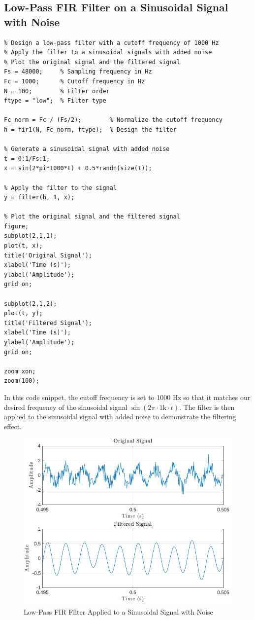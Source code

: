 \documentclass{zc-ust-hw}
\begin{document}
\subsection{Low-Pass FIR Filter on a Sinusoidal Signal with Noise}

\begin{verbatim}
% Design a low-pass filter with a cutoff frequency of 1000 Hz
% Apply the filter to a sinusoidal signals with added noise
% Plot the original signal and the filtered signal
Fs = 48000;     % Sampling frequency in Hz
Fc = 1000;      % Cutoff frequency in Hz
N = 100;        % Filter order
ftype = "low";  % Filter type

Fc_norm = Fc / (Fs/2);        % Normalize the cutoff frequency
h = fir1(N, Fc_norm, ftype);  % Design the filter

% Generate a sinusoidal signal with added noise
t = 0:1/Fs:1;
x = sin(2*pi*1000*t) + 0.5*randn(size(t));

% Apply the filter to the signal
y = filter(h, 1, x);

% Plot the original signal and the filtered signal
figure;
subplot(2,1,1);
plot(t, x);
title('Original Signal');
xlabel('Time (s)');
ylabel('Amplitude');
grid on;

subplot(2,1,2);
plot(t, y);
title('Filtered Signal');
xlabel('Time (s)');
ylabel('Amplitude');
grid on;

zoom xon;
zoom(100);
\end{verbatim}

In this code snippet, the cutoff frequency is set to 1000 Hz so that it
matches our desired frequency of the sinusoidal signal \( \sin (2\pi \cdot
1\text{k} \cdot t) \). The filter is then applied to the sinusoidal signal
with added noise to demonstrate the filtering effect.

\begin{figure}[hb]
  \begin{center}
    \includegraphics[width=\textwidth]{figures/low-pass-fir-filter-on-sin-wave.pdf}
  \end{center}
  \caption{Low-Pass FIR Filter Applied to a Sinusoidal Signal with Noise}
\end{figure}
\end{document}
